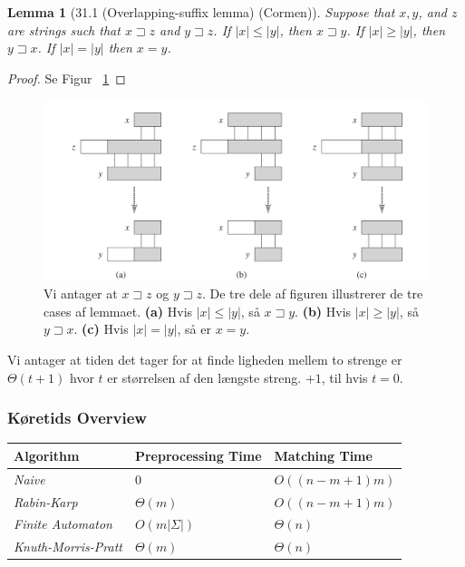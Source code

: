 \documentclass[11pt]{article}
\newtheorem{lemma}[theorem]{Lemma}
\theoremstyle{definition}
\theoremstyle{remark}
\begin{document}
\begin{lemma}[31.1 (Overlapping-suffix lemma) (Cormen)]
Suppose that $x,y$, and $z$ are strings such that $x \sqsupset z$ and $y \sqsupset z$. If $|x| \leq |y|$, then $x \sqsupset y$. If $|x| \geq |y|$, then $y \sqsupset x$. If $|x| = |y|$ then $x = y$.
\end{lemma}

\begin{proof}
  Se Figur ~\ref{fig:overlappingsuffix}
\end{proof}

\begin{figure}[ht]
  \centering
\includegraphics[width=400pt]{main--string-matching--notation-1e22.png}
  \caption{\label{fig:overlappingsuffix} Vi antager at $x \sqsupset z$ og $y \sqsupset z$. De tre dele af figuren illustrerer de tre cases af lemmaet. \textbf{(a)} Hvis $|x| \leq |y|$, så $x \sqsupset y$. \textbf{(b)} Hvis $|x| \geq |y|$, så $y \sqsupset x$. \textbf{(c)} Hvis $|x| = |y|$, så er $x = y$.}
\end{figure}

Vi antager at tiden det tager for at finde ligheden mellem to strenge er $\Theta(t+1)$ hvor $t$ er størrelsen af den længste streng. $+1$, til hvis $t = 0$.



\subsubsection{Køretids Overview}

\begin{table}[h]
\begin{tabular}{|l|l|l|}
\hline
\textbf{Algorithm}          & \textbf{Preprocessing Time} & \textbf{Matching Time} \\ \hline
\textit{Naive}              & $0$                         & $O((n-m+1)m)$          \\ \hline
\textit{Rabin-Karp}         & $\Theta (m)$                & $O((n-m+1)m)$          \\ \hline
\textit{Finite Automaton}   & $O(m |\Sigma |)$            & $\Theta (n) $          \\ \hline
\textit{Knuth-Morris-Pratt} & $\Theta (m)$                & $\Theta (n)$           \\ \hline
\end{tabular}
\end{table}
\end{document}
